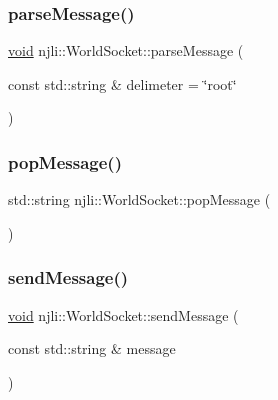 \mbox{\label{classnjli_1_1_world_socket_a72f3fbc4ed89cd5fc2c98e02e85577a0}} 
\subsubsection{\texorpdfstring{parse\+Message()}{parseMessage()}}
{\footnotesize\ttfamily \mbox{\hyperlink{_thread_8h_af1e856da2e658414cb2456cb6f7ebc66}{void}} njli\+::\+World\+Socket\+::parse\+Message (\begin{DoxyParamCaption}\item[{const std\+::string \&}]{delimeter = {\ttfamily \char`\"{}root\char`\"{}} }\end{DoxyParamCaption})}

\mbox{\label{classnjli_1_1_world_socket_ab748f606af5d49786785a5d9f3b9fa97}} 
\subsubsection{\texorpdfstring{pop\+Message()}{popMessage()}}
{\footnotesize\ttfamily std\+::string njli\+::\+World\+Socket\+::pop\+Message (\begin{DoxyParamCaption}{ }\end{DoxyParamCaption})}

\mbox{\label{classnjli_1_1_world_socket_aeb35c51f861acc84da71dd68a09fd2c2}} 
\subsubsection{\texorpdfstring{send\+Message()}{sendMessage()}}
{\footnotesize\ttfamily \mbox{\hyperlink{_thread_8h_af1e856da2e658414cb2456cb6f7ebc66}{void}} njli\+::\+World\+Socket\+::send\+Message (\begin{DoxyParamCaption}\item[{const std\+::string \&}]{message }\end{DoxyParamCaption})}

